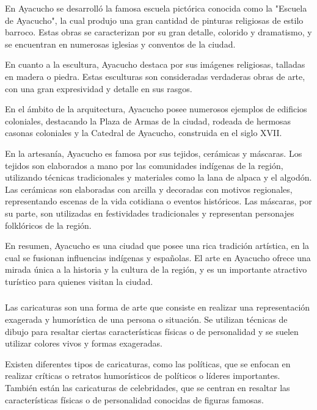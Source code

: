 \documentclass[12pt,a4paper]{article}
\begin{document}
En Ayacucho se desarrolló la famosa escuela pictórica conocida como la "Escuela de Ayacucho", la cual produjo una gran cantidad de pinturas religiosas de estilo barroco. Estas obras se caracterizan por su gran detalle, colorido y dramatismo, y se encuentran en numerosas iglesias y conventos de la ciudad.

En cuanto a la escultura, Ayacucho destaca por sus imágenes religiosas, talladas en madera o piedra. Estas esculturas son consideradas verdaderas obras de arte, con una gran expresividad y detalle en sus rasgos.

En el ámbito de la arquitectura, Ayacucho posee numerosos ejemplos de edificios coloniales, destacando la Plaza de Armas de la ciudad, rodeada de hermosas casonas coloniales y la Catedral de Ayacucho, construida en el siglo XVII.

En la artesanía, Ayacucho es famosa por sus tejidos, cerámicas y máscaras. Los tejidos son elaborados a mano por las comunidades indígenas de la región, utilizando técnicas tradicionales y materiales como la lana de alpaca y el algodón. Las cerámicas son elaboradas con arcilla y decoradas con motivos regionales, representando escenas de la vida cotidiana o eventos históricos. Las máscaras, por su parte, son utilizadas en festividades tradicionales y representan personajes folklóricos de la región.

En resumen, Ayacucho es una ciudad que posee una rica tradición artística, en la cual se fusionan influencias indígenas y españolas. El arte en Ayacucho ofrece una mirada única a la historia y la cultura de la región, y es un importante atractivo turístico para quienes visitan la ciudad.

\subsubsection{\variablei}%

Las caricaturas son una forma de arte que consiste en realizar una representación exagerada y humorística de una persona o situación. Se utilizan técnicas de dibujo para resaltar ciertas características físicas o de personalidad y se suelen utilizar colores vivos y formas exageradas.

Existen diferentes tipos de caricaturas, como las políticas, que se enfocan en realizar críticas o retratos humorísticos de políticos o líderes importantes. También están las caricaturas de celebridades, que se centran en resaltar las características físicas o de personalidad conocidas de figuras famosas.
\end{document}

